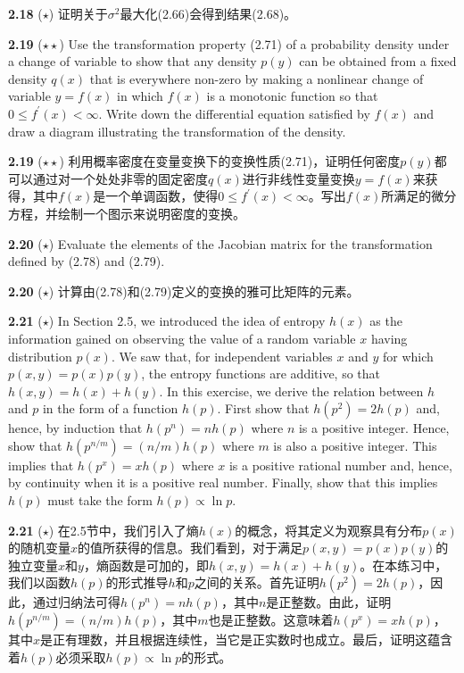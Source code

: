\documentclass{article}
\begin{document}
\textbf{2.18} ($\star$) 证明关于$\sigma^{2}$最大化(2.66)会得到结果(2.68)。

\textbf{2.19} ($\star\star$) Use the transformation property (2.71) of a probability density under a change of variable to show that any density $p(y)$ can be obtained from a fixed density $q(x)$ that is everywhere non-zero by making a nonlinear change of variable $y=f(x)$ in which $f(x)$ is a monotonic function so that $0 \leqslant f^{\prime}(x)<\infty$. Write down the differential equation satisfied by $f(x)$ and draw a diagram illustrating the transformation of the density.

\textbf{2.19} ($\star\star$) 利用概率密度在变量变换下的变换性质(2.71)，证明任何密度$p(y)$都可以通过对一个处处非零的固定密度$q(x)$进行非线性变量变换$y=f(x)$来获得，其中$f(x)$是一个单调函数，使得$0 \leqslant f^{\prime}(x)<\infty$。写出$f(x)$所满足的微分方程，并绘制一个图示来说明密度的变换。

\textbf{2.20} ($\star$) Evaluate the elements of the Jacobian matrix for the transformation defined by (2.78) and (2.79).

\textbf{2.20} ($\star$) 计算由(2.78)和(2.79)定义的变换的雅可比矩阵的元素。

\textbf{2.21} ($\star$) In Section 2.5, we introduced the idea of entropy $h(x)$ as the information gained on observing the value of a random variable $x$ having distribution $p(x)$. We saw that, for independent variables $x$ and $y$ for which $p(x, y)=p(x) p(y)$, the entropy functions are additive, so that $h(x, y)=h(x)+h(y)$. In this exercise, we derive the relation between $h$ and $p$ in the form of a function $h(p)$. First show that $h\left(p^{2}\right)=2 h(p)$ and, hence, by induction that $h\left(p^{n}\right)=n h(p)$ where $n$ is a positive integer. Hence, show that $h\left(p^{n / m}\right)=(n / m) h(p)$ where $m$ is also a positive integer. This implies that $h\left(p^{x}\right)=x h(p)$ where $x$ is a positive rational number and, hence, by continuity when it is a positive real number. Finally, show that this implies $h(p)$ must take the form $h(p) \propto \ln p$.

\textbf{2.21} ($\star$) 在2.5节中，我们引入了熵$h(x)$的概念，将其定义为观察具有分布$p(x)$的随机变量$x$的值所获得的信息。我们看到，对于满足$p(x, y)=p(x) p(y)$的独立变量$x$和$y$，熵函数是可加的，即$h(x, y)=h(x)+h(y)$。在本练习中，我们以函数$h(p)$的形式推导$h$和$p$之间的关系。首先证明$h\left(p^{2}\right)=2 h(p)$，因此，通过归纳法可得$h\left(p^{n}\right)=n h(p)$，其中$n$是正整数。由此，证明$h\left(p^{n / m}\right)=(n / m) h(p)$，其中$m$也是正整数。这意味着$h\left(p^{x}\right)=x h(p)$，其中$x$是正有理数，并且根据连续性，当它是正实数时也成立。最后，证明这蕴含着$h(p)$必须采取$h(p) \propto \ln p$的形式。
\end{document}
